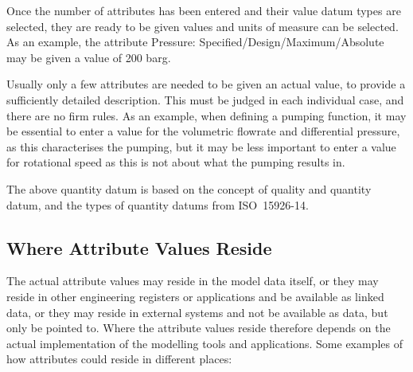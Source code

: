 \documentclass[../main.tex]{subfiles}
\begin{document}
Once the number of attributes has been entered and their value datum types are selected, they are ready to be given
values and units of measure can be selected. As an example, the attribute Pressure: Specified/Design/Maximum/Absolute may be
given a value of 200 barg.

Usually only a few attributes are needed to be given an actual value, to provide a sufficiently detailed description.
This must be judged in each individual case, and there are no firm rules. As an example, when defining a pumping
function, it may be essential to enter a value for the volumetric flowrate and differential pressure, as this
characterises the pumping, but it may be less important to enter a value for rotational speed as this is not about
what the pumping results in.

The above quantity datum is based on the concept of quality and quantity datum, and the types of quantity datums from
ISO~15926-14.

\subsection{Where Attribute Values Reside}

The actual attribute values may reside in the model data itself, or they may reside in
other engineering registers or applications and be available as linked data, or they may reside in external systems
and not be available as data, but only be pointed to. Where the attribute values reside therefore depends on the
actual implementation of the modelling tools and applications. Some examples of how attributes could reside in
different places:
\end{document}
